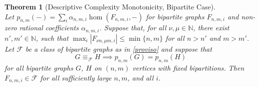 \documentclass[10pt,a4paper]{article}
\theoremstyle{definition}
\theoremstyle{plain}
\newtheorem{theorem}[definition]{Theorem}
\theoremstyle{remark}
\begin{document}
	\begin{theorem}[Descriptive Complexity Monotonicity, Bipartite Case] \label{thm:complexity-monotonicty-bipartite}
		~\\
		Let $p_{n,m}(-) = \sum_i \alpha_{n,m,i} \hom(F_{n,m,i}, -)$ for bipartite graphs $F_{n,m,i}$ and non-zero rational coefficients $\alpha_{n,m,i}$.
		Suppose that, for all $\nu, \mu \in \mathbb{N}$, there exist $n', m' \in \mathbb{N}$,
		such that $\max_i |F_{\nu n, \mu  m,i }| \leq \min\{n,m\}$ for all $n > n'$ and $m > m'$.
		Let $\mathcal{F}$ be a class of bipartite graphs as in \cref{proviso} and suppose that
		\[
		G \equiv_{\mathcal{F}} H \implies
		p_{n,m}(G) = p_{n,m}(H)
		\]
		for all bipartite graphs $G$, $H$ on $(n,m)$ vertices with fixed bipartitions.
		Then $F_{n,m,i} \in \mathcal{F}$ for all sufficiently large $n,m$, and all $i$.
	\end{theorem}
\end{document}
